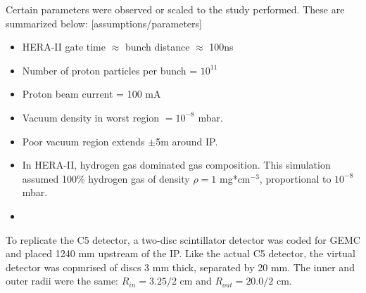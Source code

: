 Certain parameters were observed or scaled to the study performed.  These are summarized below:
[assumptions/parameters]
\begin{itemize}
	\item HERA-II gate time $\approx$ bunch distance $\approx$ 100ns
	\item Number of proton particles per bunch = $10^{11}$
	\item Proton beam current = 100 mA
	\item Vacuum density in worst region $= 10^{-8}$ mbar.
	\item Poor vacuum region extends $\pm$5m around IP.
	\item In HERA-II, hydrogen gas dominated gas composition.  This simulation assumed 100\% hydrogen gas of density $\rho = 1$ mg*cm$^{-3}$, proportional to $10^{-8}$ mbar.
	\item 

\end{itemize}

To replicate the C5 detector, a two-disc scintillator detector was coded for GEMC and placed 1240 mm upstream of the IP.  Like the actual C5 detector, the virtual detector was copmrised of discs 3 mm thick, separated by 20 mm.  The inner and outer radii were the same: $R_{in} = 3.25/2$ cm and $R_{out} = 20.0/2$ cm.  

